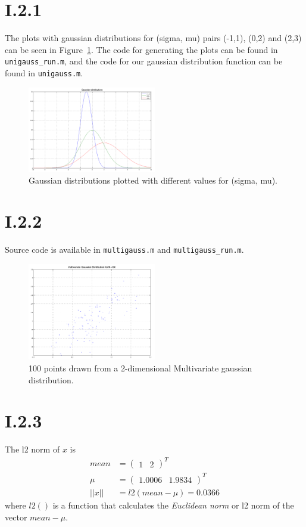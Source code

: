 \pagebreak
\section*{I.2.1}
The plots with gaussian distributions for (sigma, mu) pairs (-1,1), (0,2) and (2,3) can be
seen in Figure~\ref{fig:I.2.1}. The code for generating the plots can be found in \texttt{unigauss\_run.m}, 
and the code for our gaussian distribution function can be found in \texttt{unigauss.m}.

\begin{figure}[h!]
	\includegraphics[width=0.5\textwidth]{img/unigauss}
	\caption{Gaussian distributions plotted with different values for (sigma, mu). \label{fig:I.2.1}}
\end{figure}

\section*{I.2.2}
Source code is available in \texttt{multigauss.m} and \texttt{multigauss\_run.m}.
\begin{figure}[h!]
	\includegraphics[width=0.5\textwidth]{img/multigauss}
	\caption{100 points drawn from a 2-dimensional Multivariate gaussian distribution. \label{fig:I.2.2}}
\end{figure}

\section*{I.2.3}
The l2 norm of $x$ is 
\begin{align*}
	mean  &= \begin{pmatrix}1 & 2\end{pmatrix}^T \\
	\mu   &= \begin{pmatrix}1.0006 & 1.9834\end{pmatrix}^T \\
	||x|| &= l2(mean - \mu) = 0.0366
\end{align*}
where $l2()$ is a function that calculates the \textit{Euclidean norm} or l2 norm of the vector $mean - \mu$.

